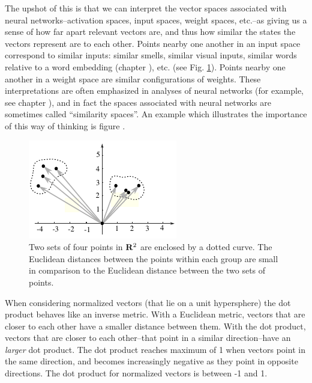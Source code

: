    The upshot of this is that we can interpret the vector spaces associated 
with neural networks--activation spaces, input spaces, weight spaces, etc.--as 
giving us a sense of how far apart relevant vectors are, and thus how similar 
the states the vectors represent are to each other. Points nearby one another 
in an input space correspond to similar inputs: similar smells, similar visual 
inputs, similar words relative to a word embedding (chapter 
), etc. (see Fig. \ref{nearfar}). Points nearby one 
another in a weight space are similar configurations of weights. These 
interpretations are often emphasized in analyses of neural networks (for 
example, see chapter ), and in fact the spaces 
associated with neural networks are sometimes called ``similarity spaces''. An 
example which illustrates the importance of this way of thinking is figure 
.

\begin{figure}[h]
\centering
\includegraphics[scale=1.55]{./images/Nearfar.pdf}
\caption{Two sets of four points in ${\bf R}^2$ are enclosed by a dotted curve. 
The Euclidean distances between the points within each group are small in 
comparison to the Euclidean distance between the two sets of points.}
\label{nearfar}
\end{figure}

When considering normalized vectors (that lie on a unit hypersphere) the dot product behaves like an inverse metric. With a Euclidean metric, vectors that are closer to each other have a smaller distance between them. With the dot product, vectors that are closer to each other--that point in a similar direction--have an \emph{larger} dot product. The dot product reaches maximum of 1 when vectors point in the same direction, and becomes increasingly negative as they point in opposite directions. The dot product for normalized vectors is between -1 and 1.

